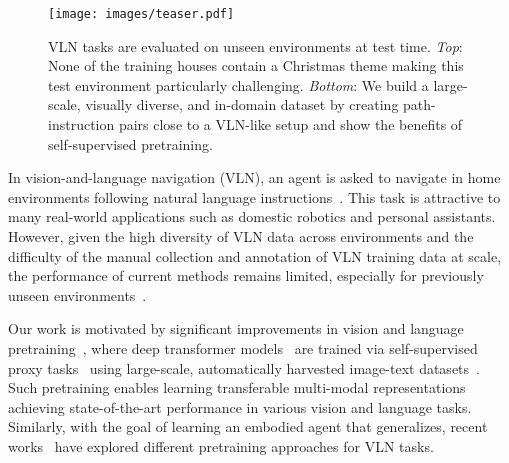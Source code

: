 \RequirePackage[dvipsnames,table]{xcolor} \documentclass[10pt,twocolumn,letterpaper]{article}
\begin{document}
\begin{figure}[t]
\centering
\texttt{[image: images/teaser.pdf]}
\vspace{-6mm}
\caption{VLN tasks are evaluated on unseen environments at test time.
\emph{Top}: None of the training houses contain a Christmas theme making this test environment particularly challenging.
\emph{Bottom}: We build a large-scale, visually diverse, and in-domain dataset by creating path-instruction pairs close to a VLN-like setup and show the benefits of self-supervised pretraining.}
\vspace{-5mm}
\label{fig:teaser}
\end{figure}


In vision-and-language navigation (VLN), an agent is asked to navigate in home environments following natural language instructions~\cite{anderson2018evaluation,anderson2018r2r}.
This task is attractive to many real-world applications such as domestic robotics and personal assistants.
However, given the high diversity of VLN data across environments and the difficulty of the manual collection and annotation of VLN training data at scale, the performance of current methods remains limited, especially for previously unseen environments~\cite{zhangdiagnosing}.



Our work is motivated by significant improvements in vision and language pretraining~\cite{alberti2019b2t2,chen2020uniter,li2020oscar,lu2019vilbert,lu2020_12in1,su2019vlbert}, where deep transformer models~\cite{vaswani2017attention} are trained via self-supervised proxy tasks~\cite{devlin2018bert} using large-scale, automatically harvested image-text datasets~\cite{ordonez2011sbu,ConceptualCaptions}.
Such pretraining enables learning transferable multi-modal representations achieving state-of-the-art performance in various vision and language tasks.
Similarly, with the goal of learning an embodied agent that generalizes, recent works~\cite{hao2020prevalent,huang2019transferable,li2019press,majumdar2020vlnbert} have explored different pretraining approaches for VLN tasks.
\end{document}
